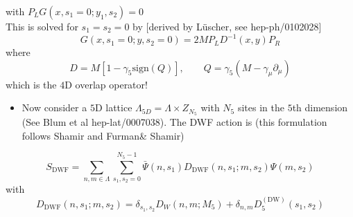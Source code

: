 with \(P_LG\left(x, s_{1}=0 ; y_{1}, s_{2}\right)=0\)\\
This is solved for \(s_{1}=s_{2}=0\) by [derived by L\"uscher, see hep-ph/0102028]
\begin{equation}
    G(x, s_1 = 0; y,s_2 = 0) = 2MP_LD^{-1}(x,y)P_R
\end{equation}
where
\begin{equation}
    D = M[1 - \gamma_5 \text{sign}(Q)], \qquad Q = \gamma_5(M - \gamma_\mu \partial_\mu)
\end{equation}
which is the $4$D overlap operator!
\begin{itemize}
    \item Now consider a $5$D lattice $\Lambda_{5D} = \Lambda \times Z_{N_5}$ with $N_5$ sites in the $5$th dimension (See Blum et al hep-lat/0007038). The DWF action is (this formulation follows Shamir and Furman\& Shamir)
\end{itemize}
\begin{equation}
    S_\text{DWF} = \sum_{n,m\in\Lambda}\sum_{s_1, s_2=0}^{N_5 - 1}\bar{\Psi}(n,s_1) D_\text{DWF}(n,s_1;m,s_2)\Psi(m,s_2)
\end{equation}
with
\begin{equation}
    D_\text{DWF}(n,s_1;m,s_2) = \delta_{s_1, s_2}D_W(n,m;M_5) + \delta_{n,m} D_5^{(\text{DW})}(s_1, s_2)
\end{equation}

